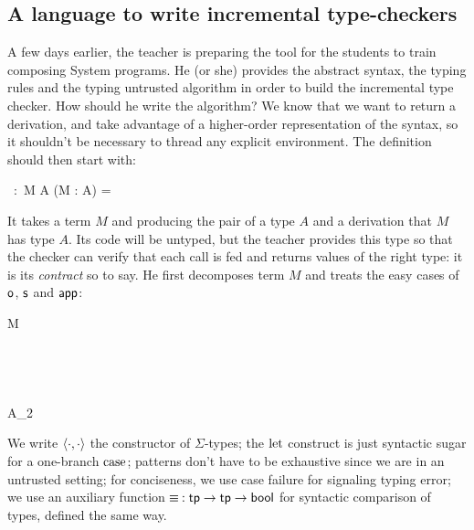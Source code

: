 \documentclass[9pt]{sigplanconf}
\begin{document}
\subsection{A language to write incremental type-checkers}

A few days earlier, the teacher is preparing the tool for the students
to train composing System  programs. He (or she) provides
the abstract syntax, the typing rules and the typing untrusted
algorithm in order to build the incremental type checker. How should
he write the algorithm? We know that we want to return a derivation,
and take advantage of a higher-order representation of the syntax, so
it shouldn't be necessary to thread any explicit environment. The
definition should then start with:

\begin{mathleft}
  \finfer{}\ :\ \prd M {} \sig A {} (\vdash M : A) =
\end{mathleft}

\noindent
It takes a term $M$ and producing the pair of a type $A$ and a
derivation that $M$ has type $A$. Its code will be untyped, but
the teacher provides this type so that the checker can verify that
each call is fed and returns values of the right type: it is its
\emph{contract} so to say. He first decomposes term $M$ and treats
the easy cases of $\text{\textsf{o}}$, $\text{\textsf{s}}$ and $\text{\textsf{app}}$:

\begin{mathleft}
  \lamd M  \\
  \quad\case{\z}  \\
  \quad{}
   {}
   \\
  \quad{}
   {} \\
  \quad\quad{} {} \\
  \quad\quad{} { {A_2}}
   {}
\end{mathleft}

\noindent
We write $\langle{\cdot}, {\cdot}\rangle$ the constructor of $\Sigma$-types; the
$\operatorname{let}$ construct is just syntactic sugar for a one-branch
$\operatorname{case}$; patterns don't have to be exhaustive since we are in
an untrusted setting; for conciseness, we use case failure for
signaling typing error; we use an auxiliary function $\!\!{}\equiv{}\!\!
: \text{\textsf{tp}}\to\text{\textsf{tp}}\to\text{\textsf{bool}}$ for syntactic comparison of types,
defined the same way.
\end{document}
